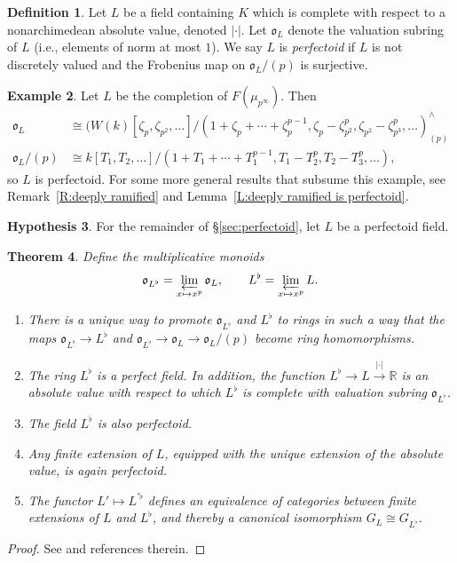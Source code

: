 \documentclass[12pt]{amsart}
\newtheorem{theorem}{Theorem}[section]
\theoremstyle{definition}
\newtheorem{defn}[theorem]{Definition}
\newtheorem{example}[theorem]{Example}
\newtheorem{hypothesis}[theorem]{Hypothesis}
\numberwithin{equation}{theorem}
\newcommand{\RR}{\mathbb{R}}
\newcommand{\frako}{\mathfrak{o}}
\begin{document}
\begin{defn}
Let $L$ be a field containing $K$ which is complete with respect to a nonarchimedean absolute value, denoted $\left| \cdot \right|$. Let $\frako_L$ denote the valuation subring of $L$ (i.e., elements of norm at most $1$). We say $L$ is \emph{perfectoid} if $L$ is not discretely valued and the Frobenius map on $\frako_L/(p)$ is surjective.
\end{defn}

\begin{example}  \label{exa:cyclotomic}
Let $L$ be the completion of $F(\mu_{p^\infty})$.
Then 
\begin{align*}
\frako_L &\cong (W(k)[\zeta_p, \zeta_{p^2}, \dots]/(1 + \zeta_p + \cdots + \zeta_p^{p-1}, \zeta_p - \zeta_{p^2}^p, \zeta_{p^2} - \zeta_{p^3}^p, \dots)^{\wedge}_{(p)} \\
\frako_L/(p) &\cong k[T_1, T_2, \dots]/(1+T_1 + \cdots + T_1^{p-1}, T_1 - T_2^p, T_2 - T_3^p, \dots),
\end{align*}
so $L$ is perfectoid.
For some more general results that subsume this example, see Remark~\ref{R:deeply ramified} and Lemma~\ref{L:deeply ramified is perfectoid}.
\end{example}

\begin{hypothesis}
For the remainder of \S\ref{sec:perfectoid}, let $L$ be a perfectoid field.
\end{hypothesis}

\begin{theorem} \label{T:perfectoid}
Define the multiplicative monoids
\[
\frako_{L^{\flat}} = \varprojlim_{x \mapsto x^p} \frako_L, \qquad
L^{\flat} = \varprojlim_{x \mapsto x^p} L.
\]
\begin{enumerate}
\item[(a)]
There is a unique way to promote $\frako_{L^{\flat}}$ and $L^{\flat}$ to rings
in such a way that the maps $\frako_{L^{\flat}} \to L^{\flat}$ and $\frako_{L^{\flat}} \to \frako_L \to \frako_L/(p)$ become ring homomorphisms.
\item[(b)]
The ring $L^{\flat}$ is a perfect field. In addition,
the function $L^{\flat} \to L \stackrel{\left| \cdot \right|}{\to} \RR$ is an absolute value with respect to which $L^{\flat}$ is complete with valuation subring $\frako_{L^{\flat}}$.

\item[(c)]
The field $L^\flat$ is also perfectoid.
\item[(d)]
Any finite extension of $L$, equipped with the unique extension of the absolute value, is again perfectoid.
\item[(e)]
The functor $L' \mapsto L^{\prime \flat}$ defines an equivalence of categories between finite extensions of $L$ and $L^{\flat}$, and thereby a canonical isomorphism $G_L \cong G_{L^{\flat}}$.
\end{enumerate}
\end{theorem}
\begin{proof}
See \cite[\S 1]{kedlaya-new-phigamma} and references therein.
\end{proof}
\end{document}
